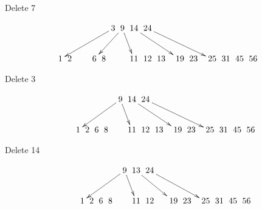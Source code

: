 \documentclass[a4paper]{article}
\begin{document}
Delete 7

$$\xymatrix @C=0pt {
  &   &   &   & & & & \ar[dlllllll] 3 &\ar[dlll]  9 \ar[dr] & 14 \ar[drrrr] & 24 \ar[drrrrrr] &  \\
 1 & 2 &  &  &   &  6 & 8 &  &   &  11 & 12 &13 &  & 19 & 23 &  & 25 & 31 & 45 & 56 \\
}$$

Delete 3

$$\xymatrix @C=0pt {
  &   &   &   & & & & &\ar[dlllll]  9 \ar[dr] & 14 \ar[drrrr] & 24 \ar[drrrrrr] &  \\
  &  &  & 1 &  2 &  6 & 8 &  &   &  11 & 12 &13 &  & 19 & 23 &  & 25 & 31 & 45 & 56 \\
}$$

Delete 14

$$\xymatrix @C=0pt {
  &   &   &   & & & & &\ar[dlllll]  9 \ar[dr] & 13 \ar[drrrr] & 24 \ar[drrrrrr] &  \\
  &  &  & 1 &  2 &  6 & 8 &  &   &  11 & 12 & &  & 19 & 23 &  & 25 & 31 & 45 & 56 \\
}$$
\end{document}
